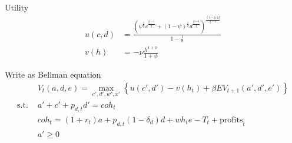 \documentclass[11pt]{article}
\begin{document}
Utility
\begin{align*}
	u(c,d)&=\frac{\left(\psi^{\frac{1}{\xi}} c^{\frac{\xi-1}{\xi}} + (1-\psi)^{\frac{1}{\xi}} d^{\frac{\xi-1}{\xi}}\right)^{\frac{(1-\frac{1}{\sigma})\xi}{\xi-1}}}{1-\frac{1}{\sigma}}  \\
	v(h)&=- \nu \frac{h^{1+\phi}}{1+\phi} 
\end{align*}


Write as Bellman equation
%
\begin{align*}
	&V_t(a,d,e) = \max_{c',d',w',x'}\left\{u(c',d') -v(h_t) + \beta E V_{t+1}(a',d',e')\right\} \\
	\text{s.t. }& a' + c' +p_{d,t}d' = coh_t \\
	&coh_t = (1+r_{t})a  + p_{d,t}(1-\delta_d)d +  w h_t e - T_t + \text{profits}_t  \\
	&a'\ge 0
\end{align*}
\end{document}
